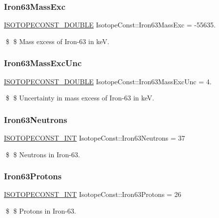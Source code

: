 \subsubsection{\texorpdfstring{Iron63\+Mass\+Exc}{Iron63MassExc}}
{\footnotesize\ttfamily \mbox{\hyperlink{group___isotope_const-_macros_ga8f45a7272ce02c0b4c65c44636ed719a}{I\+S\+O\+T\+O\+P\+E\+C\+O\+N\+S\+T\+\_\+\+D\+O\+U\+B\+LE}} Isotope\+Const\+::\+Iron63\+Mass\+Exc = -\/55635.}

\$ \$ Mass excess of Iron-\/63 in keV. \mbox{\label{group___isotope_const-_iron-_fe63_ga8e505e19d66a17f2e0b6064314b18543}} 
\subsubsection{\texorpdfstring{Iron63\+Mass\+Exc\+Unc}{Iron63MassExcUnc}}
{\footnotesize\ttfamily \mbox{\hyperlink{group___isotope_const-_macros_ga8f45a7272ce02c0b4c65c44636ed719a}{I\+S\+O\+T\+O\+P\+E\+C\+O\+N\+S\+T\+\_\+\+D\+O\+U\+B\+LE}} Isotope\+Const\+::\+Iron63\+Mass\+Exc\+Unc = 4.}

\$ \$ Uncertainty in mass excess of Iron-\/63 in keV. \mbox{\label{group___isotope_const-_iron-_fe63_ga6760a1c9f4dc33ab5681b24876df3de9}} 
\subsubsection{\texorpdfstring{Iron63\+Neutrons}{Iron63Neutrons}}
{\footnotesize\ttfamily \mbox{\hyperlink{group___isotope_const-_macros_ga5f18360b3e99483a35c32d789e62621c}{I\+S\+O\+T\+O\+P\+E\+C\+O\+N\+S\+T\+\_\+\+I\+NT}} Isotope\+Const\+::\+Iron63\+Neutrons = 37}

\$ \$ Neutrons in Iron-\/63. \mbox{\label{group___isotope_const-_iron-_fe63_ga1bc17e652fd82818cdadd39172f7f34d}} 
\subsubsection{\texorpdfstring{Iron63\+Protons}{Iron63Protons}}
{\footnotesize\ttfamily \mbox{\hyperlink{group___isotope_const-_macros_ga5f18360b3e99483a35c32d789e62621c}{I\+S\+O\+T\+O\+P\+E\+C\+O\+N\+S\+T\+\_\+\+I\+NT}} Isotope\+Const\+::\+Iron63\+Protons = 26}

\$ \$ Protons in Iron-\/63. 